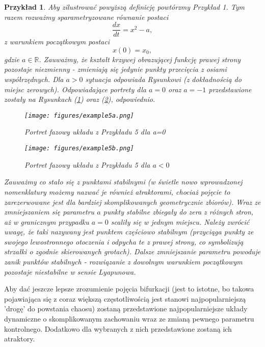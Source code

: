 \documentclass[12pt]{article}
\newtheorem{przyklad}{Przykład}
\begin{document}
\begin{przyklad}\label{przyklad5}
	Aby zilustrować powyższą definicję powtórzmy Przykład 1. Tym razem rozważmy sparametryzowane równanie postaci
	\begin{equation}
	\frac{dx}{dt} = x^2-a,
	\end{equation}
	z warunkiem początkowym postaci
	\begin{equation}
	x(0) = x_{0},
	\end{equation}
	gdzie $ a \in \mathbb{R} $. Zauważmy, że kształt krzywej obrazującej funkcję prawej strony pozostaje niezmienny - zmieniają się jedynie punkty przecięcia z osiami współrzędnych. Dla $ a > 0 $ sytuacja odpowiada Rysunkowi (z dokładnością do miejsc zerowych). Odpowiadające portrety dla $ a = 0 $ oraz $ a = -1 $ przedstawione zostały na Rysunkach (\ref{Fig6}) oraz (\ref{Fig7}), odpowiednio.
	\begin{figure}[H]
	\texttt{[image: figures/example5a.png]} 
	\centering
	\caption{Portret fazowy układu z Przykładu 5 dla a=0}
	\label{Fig6}
	\end{figure}
	\begin{figure}[H]
	\texttt{[image: figures/example5b.png]} 
	\centering
	\caption{Portret fazowy układu z Przykładu 5 dla $ a<0 $}
	\label{Fig7}
	\end{figure}
Zauważmy co stało się z punktami stabilnymi (w świetle nowo wprowadzonej nomenklatury możemy nazwać je również atraktorami, chociaż pojęcie to zarezerwowane jest dla bardziej skomplikowanych geometrycznie zbiorów). Wraz ze zmniejszaniem się parametru $ a $ punkty stabilne zbiegały do zera z różnych stron, aż w granicznym przypadku $ a=0 $ scaliły się w jednym miejscu. Należy zwrócić uwagę, że taki nazywany jest punktem częściowo stabilnym (przyciąga punkty ze swojego lewostronnego otoczenia i odpycha te z prawej strony, co symbolizują strzałki o zgodnie skierowanych grotach). Dalsze zmniejszanie parametru powoduje zanik punktów stabilnych - rozwiązanie z dowolnym warunkiem początkowym pozostaje niestabilne w sensie Lyapunowa. 
\end{przyklad}
Aby dać jeszcze lepsze zrozumienie pojęcia bifurkacji (jest to istotne, bo takowa pojawiająca się z coraz większą częstotliwością jest stanowi najpopularniejszą 'drogę' do powstania chaosu) zostaną przedstawione najpopularniejsze układy dynamiczne o skomplikowanym zachowaniu wraz ze zmianą pewnego parametru kontrolnego. Dodatkowo dla wybranych z nich przedstawione zostaną ich atraktory.
\end{document}
